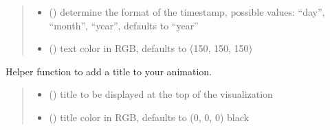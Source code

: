 \documentclass[letterpaper,10pt,english]{sphinxmanual}
\begin{document}
\begin{fulllineitems}
\begin{fulllineitems}
\begin{quote}
\begin{description}
\begin{itemize}
\item {} 
\sphinxAtStartPar
{} () \textendash{} determine the format of the timestamp, possible values: “day”, “month”, “year”, defaults to “year”

\item {} 
\sphinxAtStartPar
{} () \textendash{} text color in RGB, defaults to (150, 150, 150)

\end{itemize}

\end{description}\end{quote}

\end{fulllineitems}


\begin{fulllineitems}
\label{\detokenize{index:sjvisualizer.Canvas.canvas.add_title}}
\pysigstartsignatures
{}
\pysigstopsignatures
\sphinxAtStartPar
Helper function to add a title to your animation.
\begin{quote}\begin{description}
\begin{itemize}
\item {} 
\sphinxAtStartPar
{} () \textendash{} title to be displayed at the top of the visualization

\item {} 
\sphinxAtStartPar
{} () \textendash{} title color in RGB, defaults to (0, 0, 0) black

\end{itemize}

\end{description}\end{quote}

\end{fulllineitems}


\end{fulllineitems}
\end{document}
